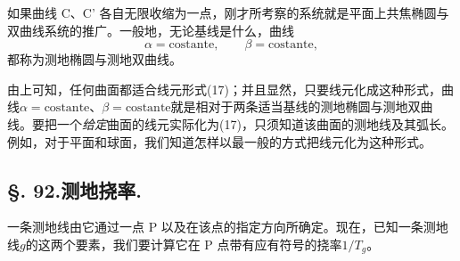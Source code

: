 如果曲线 C、C' 各自无限收缩为一点，刚才所考察的系统就是平面上共焦椭圆与双曲线系统的推广。一般地，无论基线是什么，曲线
\[
 \alpha=\mathrm{costante},
 \qquad
 \beta=\mathrm{costante},
\]
都称为测地椭圆与测地双曲线。

由上可知，任何曲面都适合线元形式(17)；并且显然，只要线元化成这种形式，曲线\(\alpha=\mathrm{costante}\)、\(\beta=\mathrm{costante}\)就是相对于两条适当基线的测地椭圆与测地双曲线。要把一个\emph{给定}曲面的线元实际化为(17)，只须知道该曲面的测地线及其弧长。例如，对于平面和球面，我们知道怎样以最一般的方式把线元化为这种形式。

\subsection*{\S. 92.\quad 测地挠率.}

一条测地线由它通过一点 P 以及在该点的指定方向所确定。现在，已知一条测地线\(g\)的这两个要素，我们要计算它在 P 点带有应有符号的挠率\(1/T_g\)。

